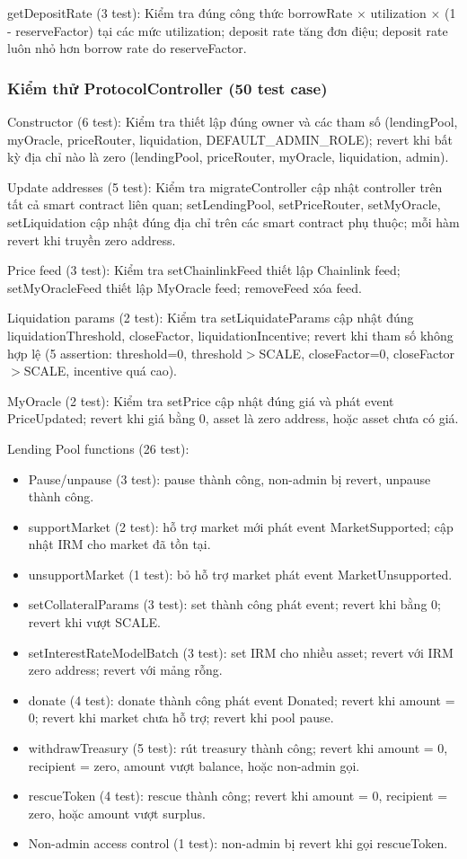 \documentclass[../DoAn.tex]{subfiles}
\begin{document}
getDepositRate (3 test): Kiểm tra đúng công thức borrowRate $\times$ utilization $\times$ (1 - reserveFactor) tại các mức utilization; deposit rate tăng đơn điệu; deposit rate luôn nhỏ hơn borrow rate do reserveFactor.

\subsubsection{Kiểm thử ProtocolController (50 test case)}


Constructor (6 test): Kiểm tra thiết lập đúng owner và các tham số (lendingPool, myOracle, priceRouter, liquidation, DEFAULT\_ADMIN\_ROLE); revert khi bất kỳ địa chỉ nào là zero (lendingPool, priceRouter, myOracle, liquidation, admin).

Update addresses (5 test): Kiểm tra migrateController cập nhật controller trên tất cả smart contract liên quan; setLendingPool, setPriceRouter, setMyOracle, setLiquidation cập nhật đúng địa chỉ trên các smart contract phụ thuộc; mỗi hàm revert khi truyền zero address.

Price feed (3 test): Kiểm tra setChainlinkFeed thiết lập Chainlink feed; setMyOracleFeed thiết lập MyOracle feed; removeFeed xóa feed.

Liquidation params (2 test): Kiểm tra setLiquidateParams cập nhật đúng liquidationThreshold, closeFactor, liquidationIncentive; revert khi tham số không hợp lệ (5 assertion: threshold=0, threshold$>$SCALE, closeFactor=0, closeFactor$>$SCALE, incentive quá cao).

MyOracle (2 test): Kiểm tra setPrice cập nhật đúng giá và phát event PriceUpdated; revert khi giá bằng 0, asset là zero address, hoặc asset chưa có giá.

Lending Pool functions (26 test):

\begin{itemize}
  \item Pause/unpause (3 test): pause thành công, non-admin bị revert, unpause thành công.
  \item supportMarket (2 test): hỗ trợ market mới phát event MarketSupported; cập nhật IRM cho market đã tồn tại.
  \item unsupportMarket (1 test): bỏ hỗ trợ market phát event MarketUnsupported.
  \item setCollateralParams (3 test): set thành công phát event; revert khi bằng 0; revert khi vượt SCALE.
  \item setInterestRateModelBatch (3 test): set IRM cho nhiều asset; revert với IRM zero address; revert với mảng rỗng.
  \item donate (4 test): donate thành công phát event Donated; revert khi amount = 0; revert khi market chưa hỗ trợ; revert khi pool pause.
  \item withdrawTreasury (5 test): rút treasury thành công; revert khi amount = 0, recipient = zero, amount vượt balance, hoặc non-admin gọi.
  \item rescueToken (4 test): rescue thành công; revert khi amount = 0, recipient = zero, hoặc amount vượt surplus.
  \item Non-admin access control (1 test): non-admin bị revert khi gọi rescueToken.
\end{itemize}
\end{document}
